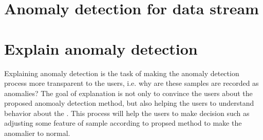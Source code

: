 \section{Anomaly detection for data stream}
\label{sec-data_stream}



\section{Explain anomaly detection}
\label{sec-explain_anomaly}
Explaining anomaly detection is the task of making
the anomaly detection process more transparent to the users,
i.e. why are these samples are recorded as anomalies?
The  goal of explanation is not only to
convince the users about the proposed anomoaly detection method,
but also helping the users to understand behavior about
the .
This process will help the users to make decision such as
adjusting some feature of sample according to propsed method to
make the anomalier to normal.


